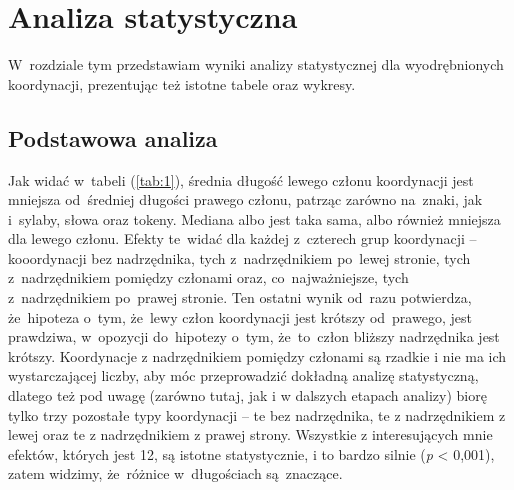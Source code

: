 \documentclass[licencjacka]{pracamgr_Kogni}
\begin{document}
    \chapter{Analiza statystyczna}\label{ch:analiza-statystyczna}
    W~rozdziale tym przedstawiam wyniki analizy statystycznej dla wyodrębnionych koordynacji, prezentując też istotne tabele oraz wykresy.


    \section{Podstawowa analiza}\label{sec:podstawowa-analiza}
    Jak widać w~tabeli (\ref{tab:1}), średnia długość lewego członu koordynacji jest mniejsza od~średniej długości prawego członu, patrząc zarówno na~znaki, jak i~sylaby, słowa oraz tokeny.
    Mediana albo jest taka sama, albo również mniejsza dla lewego członu.
    Efekty te~widać dla każdej z~czterech grup koordynacji -- kooordynacji bez nadrzędnika, tych z~nadrzędnikiem po~lewej stronie, tych z~nadrzędnikiem pomiędzy członami oraz, co~najważniejsze, tych z~nadrzędnikiem po~prawej stronie.
    Ten ostatni wynik od~razu potwierdza, że~hipoteza o~tym, że~lewy człon koordynacji jest krótszy od~prawego, jest prawdziwa, w~opozycji do~hipotezy o~tym, że~to~człon bliższy nadrzędnika jest krótszy.
    Koordynacje z nadrzędnikiem pomiędzy członami są rzadkie i nie ma ich wystarczającej liczby, aby móc przeprowadzić dokładną analizę statystyczną, dlatego też pod uwagę (zarówno tutaj, jak i w dalszych etapach analizy) biorę tylko trzy pozostałe typy koordynacji -- te bez nadrzędnika, te z nadrzędnikiem z lewej oraz te z nadrzędnikiem z prawej strony.
    Wszystkie z interesujących mnie efektów, których jest 12, są istotne statystycznie, i to bardzo silnie (\textit{p} < 0,001), zatem widzimy, że~różnice w~długościach są~znaczące.
\end{document}
